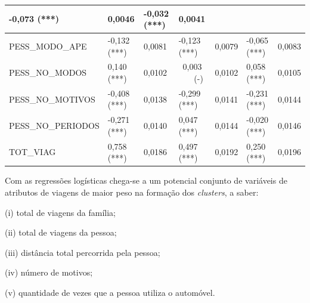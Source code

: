 \begin{table}[htb]
{\begin{tabular}{P{4.00cm} P{1.5cm} P{1.5cm} P{1.5cm} P{1.5cm} P{1.52cm} P{1.5cm}}
				-0,073 (***)&
				0,0046&				
				-0,032 (***)&
				0,0041\\	
       \hline
				PESS_MODO_APE& 
				-0,132 (***)&
				0,0081&
				-0,123 (***)&
				0,0079&				
				-0,065 (***)&
				0,0083\\	
       \hline
				PESS_NO_MODOS& 
				0,140 (***)&
				0,0102&
				\ 0,003$\quad$ \ (-)&
				0,0102&				
				0,058 (***)&
				0,0105\\	
       \hline
				PESS_NO_MOTIVOS& 
				-0,408 (***)&
				0,0138&
				-0,299 (***)&
				0,0141&				
				-0,231 (***)&
				0,0144\\	
       \hline
				PESS_NO_PERIODOS& 
				-0,271 (***)&
				0,0140&
				0,047 (***)&
				0,0144&				
				-0,020 (***)&
				0,0146\\	
       \hline
				TOT_VIAG& 
				0,758 (***)&
				0,0186&
				0,497 (***)&
				0,0192&				
				0,250 (***)&
				0,0196\\	
			\bottomrule	
		\end{tabular}
    }{%
	}
\end{table}

Com as regressões logísticas chega-se a um potencial conjunto de variáveis de atributos de viagens de maior peso na formação dos \textit{clusters}, a saber:
\begin{compactitem}[]
\item (i) total de viagens da família;
\item (ii) total de viagens da pessoa;
\item (iii) distância total percorrida pela pessoa;
\item (iv) número de motivos;
\item (v) quantidade de vezes que a pessoa utiliza o automóvel.
\end{compactitem}

